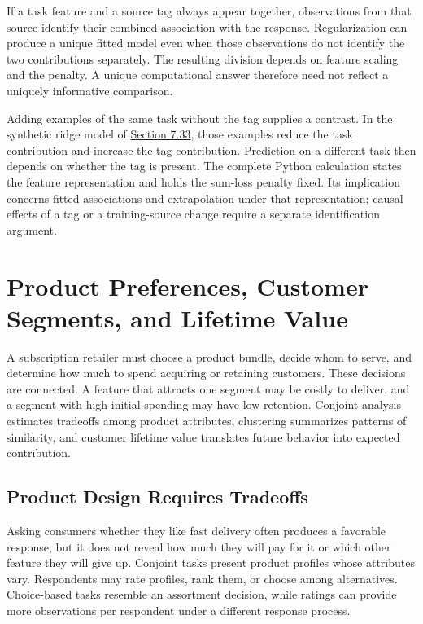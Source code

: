 \noindent \noindent If a task feature and a source tag always appear together,
observations from that source identify their combined association with
the response. Regularization can produce a unique fitted model even when
those observations do not identify the two contributions separately. The
resulting division depends on feature scaling and the penalty. A unique
computational answer therefore need not reflect a uniquely informative
comparison.

Adding examples of the same task without the tag supplies a contrast. In
the synthetic ridge model of
\href{M07_Prediction_and_Machine_Learning.md}{Section 7.33}, those
examples reduce the task contribution and increase the tag contribution.
Prediction on a different task then depends on whether the tag is
present. The complete Python calculation states the feature
representation and holds the sum-loss penalty fixed. Its implication
concerns fitted associations and extrapolation under that
representation; causal effects of a tag or a training-source change
require a separate identification argument.

\hypertarget{M04-m4.-product-preferences-customer-segments-and-lifetime-value}{%
\chapter{Product Preferences, Customer Segments, and Lifetime
Value}\label{M04-m4.-product-preferences-customer-segments-and-lifetime-value}}

\noindent A subscription retailer must choose a product bundle, decide whom to
serve, and determine how much to spend acquiring or retaining customers.
These decisions are connected. A feature that attracts one segment may
be costly to deliver, and a segment with high initial spending may have
low retention. Conjoint analysis estimates tradeoffs among product
attributes, clustering summarizes patterns of similarity, and customer
lifetime value translates future behavior into expected contribution.

\hypertarget{M04-product-design-requires-tradeoffs}{%
\section{Product Design Requires
Tradeoffs}\label{M04-product-design-requires-tradeoffs}}

\noindent Asking consumers whether they like fast delivery often produces a
favorable response, but it does not reveal how much they will pay for it
or which other feature they will give up. Conjoint tasks present product
profiles whose attributes vary. Respondents may rate profiles, rank
them, or choose among alternatives. Choice-based tasks resemble an
assortment decision, while ratings can provide more observations per
respondent under a different response process.


